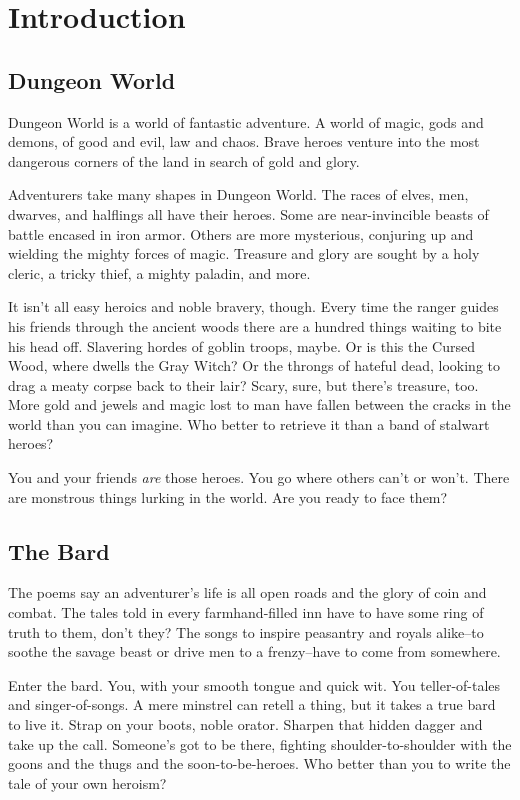 \chapter{Introduction}
\section{Dungeon World}


 Dungeon World is a world of fantastic adventure. A world of magic, gods and demons, of good and evil, law and chaos. Brave heroes venture into the most dangerous corners of the land in search of gold and glory.


 Adventurers take many shapes in Dungeon World. The races of elves, men, dwarves, and halflings all have their heroes. Some are near-invincible beasts of battle encased in iron armor. Others are more mysterious, conjuring up and wielding the mighty forces of magic. Treasure and glory are sought by a holy cleric, a tricky thief, a mighty paladin, and more.


 It isn't all easy heroics and noble bravery, though. Every time the ranger guides his friends through the ancient woods there are a hundred things waiting to bite his head off. Slavering hordes of goblin troops, maybe. Or is this the Cursed Wood, where dwells the Gray Witch? Or the throngs of hateful dead, looking to drag a meaty corpse back to their lair? Scary, sure, but there's treasure, too. More gold and jewels and magic lost to man have fallen between the cracks in the world than you can imagine. Who better to retrieve it than a band of stalwart heroes? 


 You and your friends \emph{are}
 those heroes. You go where others can't or won't. There are monstrous things lurking in the world. Are you ready to face them?
\section{The Bard}


 The poems say an adventurer's life is all open roads and the glory of coin and combat. The tales told in every farmhand-filled inn have to have some ring of truth to them, don't they? The songs to inspire peasantry and royals alike--to soothe the savage beast or drive men to a frenzy--have to come from somewhere.


 Enter the bard. You, with your smooth tongue and quick wit. You teller-of-tales and singer-of-songs. A mere minstrel can retell a thing, but it takes a true bard to live it. Strap on your boots, noble orator. Sharpen that hidden dagger and take up the call. Someone's got to be there, fighting shoulder-to-shoulder with the goons and the thugs and the soon-to-be-heroes. Who better than you to write the tale of your own heroism?


